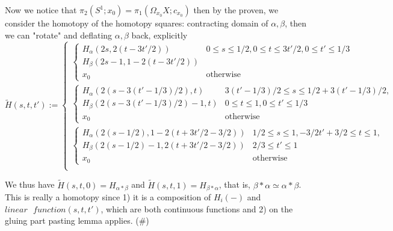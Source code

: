 \documentclass[11pt]{article}
\theoremstyle{remark}
\begin{document}
\begin{itemize}
    Now we notice that  $\pi_2(S^1;x_0)=\pi_1(\Omega_{x_0}X;c_{x_0})$ then by the proven, we consider the homotopy of the homotopy squares: contracting domain of $\alpha,\beta$, then we can "rotate" and deflating $\alpha,\beta$ back, explicitly  
    \[
    \tilde{H}(s,t,t'):= \begin{cases} 
    \begin{cases}
     H_\alpha(2s,2(t-3t'/2)) & \text{} 0\leq s \leq 1/2, 0\leq t \leq 3t'/2,  0 \leq t' \leq 1/3 \\ 
     H_\beta(2s-1,1-2(t-3t'/2)) & \text{} \\
     x_0 & \text{otherwise} 
     
    \end{cases} \\
    
    \begin{cases}
     H_\alpha(2(s-3(t'-1/3)/2),t) & \text{} 3(t'-1/3)/2\leq s \leq 1/2+3(t'-1/3)/2, \\
     H_\beta(2(s-3(t'-1/3)/2)-1,t) & \text{} 0\leq t \leq 1, 0 \leq t' \leq 1/3 \\
     x_0 & \text{otherwise} 
     
    \end{cases} \\

    \begin{cases}
     H_\alpha(2(s-1/2),1-2(t+3t'/2-3/2)) & \text{} 1/2\leq s \leq 1, -3/2t'+3/2\leq t \leq 1,\\ 
     H_\beta(2(s-1/2)-1,2(t+3t'/2-3/2)) & \text{}  2/3 \leq t' \leq 1 \\
     x_0 & \text{otherwise} 
     
    \end{cases} \\
    \end{cases}
    \]
    
    We thus have $\tilde{H}(s,t,0)=H_{\alpha * \beta}$ and $\tilde{H}(s,t,1)=H_{\beta * \alpha}$, that is, $\beta \ast \alpha \simeq \alpha \ast \beta $.
    This is really a homotopy since 1) it is a composition of $H_i(-)$ and $linear \textrm{ }function(s,t,t')$, which are both continuous functions and 2) on the gluing part pasting lemma applies. (#)
    

\end{itemize}
\end{document}
